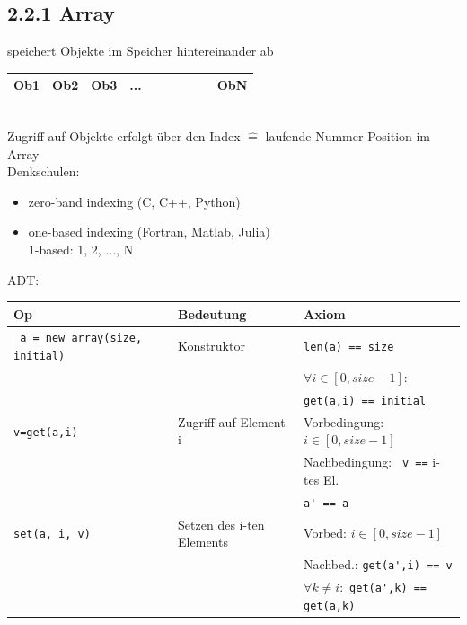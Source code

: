 \documentclass[11pt, fleqn]{scrreprt}
\begin{document}
	\subsection*{2.2.1 Array}	
	speichert Objekte im Speicher hintereinander ab \\
	
	\begin{tabular}{| C{1cm} | C{1cm} | C{1cm} | C{1cm} |C{1cm} | C{1cm}| C{1cm} |C{1cm}| C{1cm}| C{1cm}| }
		\hline
		Ob1 & Ob2 & Ob3 & ... & & & & & & ObN \\ \hline
	\end{tabular} \\
	
	Zugriff auf Objekte erfolgt über den Index $\widehat{=}$ laufende Nummer Position im Array \\
	
	Denkschulen:
	\begin{itemize}
		\item zero-band indexing (C, C++, Python) \\
		\item one-based indexing (Fortran, Matlab, Julia)\\
		1-based: 1, 2, ..., N
	\end{itemize}
	
	ADT: \\
	\begin{tabular}{C{5cm} C{5cm} C{5cm}}
		Op & Bedeutung & Axiom \\ \hline
		\verb| a = new_array(size, initial)| & Konstruktor & \verb|len(a) == size| \\
		& & $\forall i \in [0, size - 1]$: \\
		& & \verb|get(a,i) == initial| \\ \hline
		\verb|v=get(a,i)| & Zugriff auf Element i & Vorbedingung: $i \in [0, size-1]$ \\
		& & Nachbedingung: \verb| v ==| i-tes El. \\
		& & \verb|a' == a| \\ \hline
		\verb|set(a, i, v)| & Setzen des i-ten Elements & Vorbed: $ i \in [0, size-1]$ \\
		& & Nachbed.: \verb|get(a',i) == v| \\
		& & $\forall k \neq i:$ \verb|get(a',k) == get(a,k)| \\
	\end{tabular}
	
\end{document}
